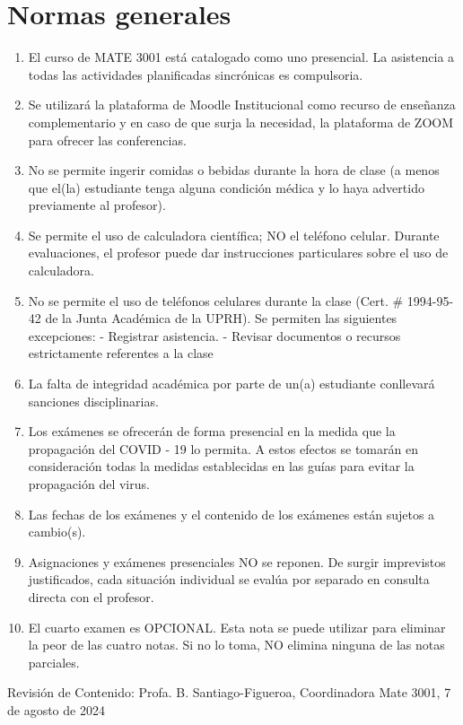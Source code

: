 \documentclass{article}
\begin{document}
\section*{Normas generales}
\begin{enumerate}
    \item El curso de MATE 3001 está catalogado como uno presencial. La asistencia a todas las actividades planificadas sincrónicas es compulsoria.
    \item Se utilizará la plataforma de Moodle Institucional como recurso de enseñanza complementario y en caso de que surja la necesidad, la plataforma de ZOOM para ofrecer las conferencias.
    \item No se permite ingerir comidas o bebidas durante la hora de clase (a menos que el(la) estudiante tenga alguna condición médica y lo haya advertido previamente al profesor).
    \item Se permite el uso de calculadora científica; NO el teléfono celular. Durante evaluaciones, el profesor puede dar instrucciones particulares sobre el uso de calculadora.
    \item No se permite el uso de teléfonos celulares durante la clase (Cert. \# 1994-95-42 de la Junta Académica de la UPRH). Se permiten las siguientes excepciones:
    \subitem - Registrar asistencia.
    \subitem - Revisar documentos o recursos estrictamente referentes a la clase
    \item La falta de integridad académica por parte de un(a) estudiante conllevará sanciones disciplinarias.
    \item Los exámenes se ofrecerán de forma presencial en la medida que la propagación del COVID - 19 lo permita. A estos efectos se tomarán en consideración todas la medidas establecidas en las guías para evitar la propagación del virus.
    \item Las fechas de los exámenes y el contenido de los exámenes están sujetos a cambio(s).
    \item Asignaciones y exámenes presenciales NO se reponen. De surgir imprevistos justificados, cada situación individual se evalúa por separado en consulta directa con el profesor.
    \item El cuarto examen es OPCIONAL. Esta nota se puede utilizar para eliminar la peor de las cuatro notas. Si no lo toma, NO elimina ninguna de las notas parciales.
\end{enumerate}

\vspace{1cm}

\begin{center}
    Revisión de Contenido: Profa. B. Santiago-Figueroa, Coordinadora Mate 3001, 7 de agosto de 2024
\end{center}
\end{document}
